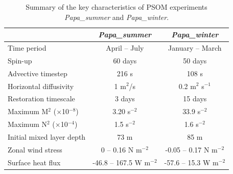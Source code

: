 \documentclass[draft,linenumbers]{agujournal2018}
\begin{document}
\begin{table}[t]
\caption{Summary of the key characteristics of PSOM experiments \textit{Papa\_summer} and \textit{Papa\_winter}.}
	\label{tab: meso_vs_submeso}
	\centering
 \centering
\begin{tabular}{|l|c|c|}
		\hline
											& \textit{Papa\_summer} & \textit{Papa\_winter} \\
		\hline
		Time period 								& April -- July             & January -- March          \\
		Spin-up								& 60 days                   & 50 days                   \\
		Advective timestep				    & 216 s                     & 108 s                     \\
		Horizontal diffusivity			    & 1 m$^2$/s                 & 0.2 m$^2$ s$^{-1}$        \\
		Restoration timescale			    & 3 days                    & 15 days                   \\
		Maximum M$^2$ ($\times$10$^{-8}$)	& 3.20 s$^{-2}$             & 33.9 s$^{-2}$             \\	
		Maximum N$^2$ ($\times$10$^{-4}$)	& 1.5 s$^{-2}$              & 1.6 s$^{-2}$              \\
		Initial mixed layer depth           & 73 m                      & 85 m                      \\
		Zonal wind stress                	& 0 -- 0.16 N m$^{-2}$      & -0.05 -- 0.17 N m$^{-2}$  \\	
		Surface heat flux               	& -46.8 -- 167.5 W m$^{-2}$ & -57.6 -- 15.3 W m$^{-2}$  \\	
		\hline
	\end{tabular}
\end{table}

\end{document}
